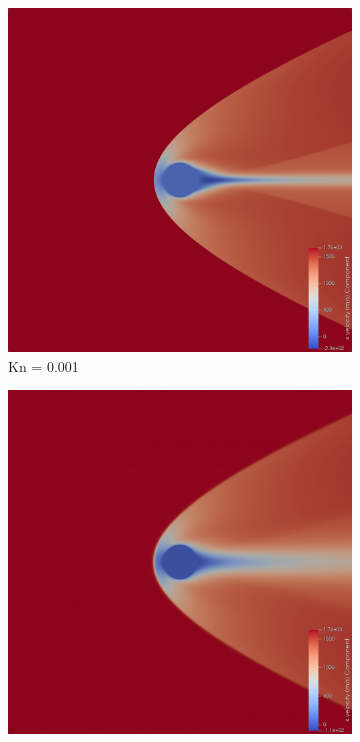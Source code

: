 \begin{figure}
    \centering
    \begin{subfigure}{0.32\textwidth}
        \centering
        \includegraphics[width=\textwidth]{Images/4. Results/Circle Kn/pv/Kn0.001.png}
        \caption{Kn = 0.001}
    \end{subfigure}
    \hfill
    \begin{subfigure}{0.32\textwidth}
        \centering
        \includegraphics[width=\textwidth]{Images/4. Results/Circle Kn/pv/Kn0.01.png}

\end{subfigure}
\end{figure}
